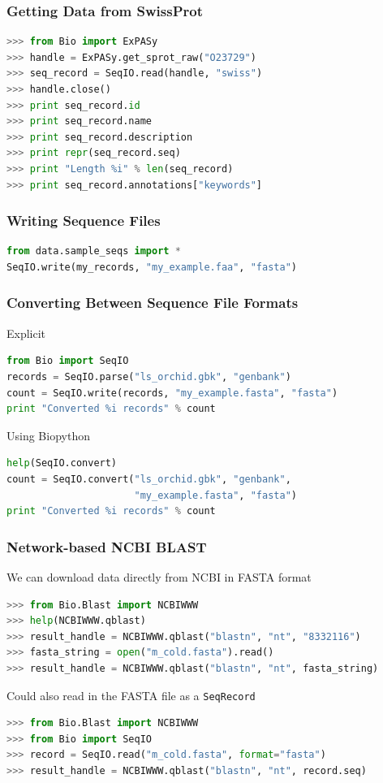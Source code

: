\documentclass[xcolor=table,10pt,final]{beamer}
\begin{document}
\begin{frame}[fragile]
	\frametitle{Getting Data from SwissProt}
	\begin{lstlisting}[language=python]
>>> from Bio import ExPASy
>>> handle = ExPASy.get_sprot_raw("O23729")
>>> seq_record = SeqIO.read(handle, "swiss")
>>> handle.close()
>>> print seq_record.id
>>> print seq_record.name
>>> print seq_record.description
>>> print repr(seq_record.seq)
>>> print "Length %i" % len(seq_record)
>>> print seq_record.annotations["keywords"]
	\end{lstlisting}
\end{frame}


\begin{frame}[fragile]
	\frametitle{Writing Sequence Files}
	\begin{lstlisting}[language=python]
from data.sample_seqs import *
SeqIO.write(my_records, "my_example.faa", "fasta")
	\end{lstlisting}
\end{frame}



\begin{frame}[fragile]
	\frametitle{Converting Between Sequence File Formats}
	Explicit
	\begin{lstlisting}[language=python]
from Bio import SeqIO
records = SeqIO.parse("ls_orchid.gbk", "genbank")
count = SeqIO.write(records, "my_example.fasta", "fasta")
print "Converted %i records" % count
	\end{lstlisting}
	Using Biopython
	\begin{lstlisting}[language=python]
help(SeqIO.convert)
count = SeqIO.convert("ls_orchid.gbk", "genbank",
                      "my_example.fasta", "fasta")
print "Converted %i records" % count
	\end{lstlisting}
\end{frame}



\begin{frame}[fragile]
	\frametitle{Network-based NCBI BLAST}
	We can download data directly from NCBI in FASTA format
	\begin{lstlisting}[language=python]
>>> from Bio.Blast import NCBIWWW
>>> help(NCBIWWW.qblast)
>>> result_handle = NCBIWWW.qblast("blastn", "nt", "8332116")
>>> fasta_string = open("m_cold.fasta").read()
>>> result_handle = NCBIWWW.qblast("blastn", "nt", fasta_string)
	\end{lstlisting}
	Could also read in the FASTA file as a \texttt{SeqRecord}
	\begin{lstlisting}[language=python]
>>> from Bio.Blast import NCBIWWW
>>> from Bio import SeqIO
>>> record = SeqIO.read("m_cold.fasta", format="fasta")
>>> result_handle = NCBIWWW.qblast("blastn", "nt", record.seq)
	\end{lstlisting}
\end{frame}
\end{document}
